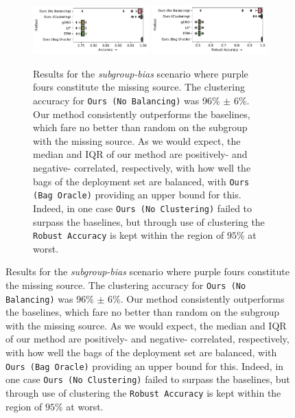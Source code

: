 \begin{figure}[t]
  \centering
  \begin{subfigure}[b]{\textwidth}
  \includegraphics[width=0.49\textwidth]{supmatch/figures/cmnist/subgroup_bias/cmnist_2v4_partial_acc.pdf}
  \includegraphics[width=0.49\textwidth]{supmatch/figures/cmnist/subgroup_bias/cmnist_2v4_partial_acc-min.pdf}
  \caption{
    Results for the \emph{subgroup-bias} scenario where {\color{purple}purple} fours constitute the missing source.
    The clustering accuracy for \texttt{Ours (No Balancing)} was 96\% $\pm$ 6\%.
    Our method consistently outperforms the baselines, which fare no better than random on the subgroup with the missing source. 
    As we would expect, the median and IQR of our method are positively- and negative- correlated, respectively, with how well the bags of the deployment set are balanced, with \texttt{Ours (Bag Oracle)} providing an upper bound for this.
    Indeed, in one case \texttt{Ours (No Clustering)} failed to surpass the baselines, but through use of clustering the \texttt{Robust Accuracy} is kept within the region of $95\%$ at worst.
  }%
  \label{fig:cmnist-2v4-partial}
  \end{subfigure}
  

\end{figure}
